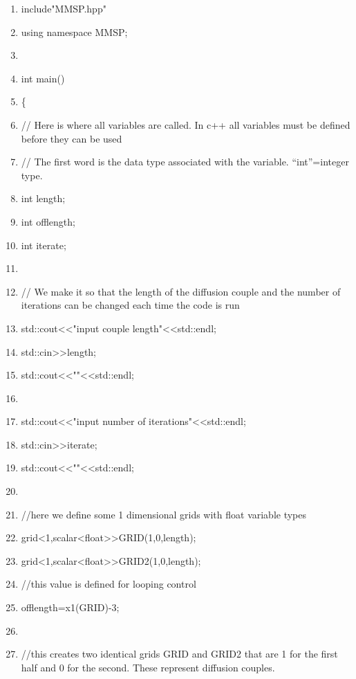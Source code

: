 \documentclass{article}
\begin{document}
\begin{shadebox}

\begin{enumerate}  \itemsep1pt \parskip0pt 
\item include"MMSP.hpp"
\item using namespace MMSP;
\item  
\item int main()
\item \{
\item // Here is where all variables are called.  In c++ all variables must be defined before they can be used
\item // The first word is the data type associated with the variable. “int”=integer type.
\item int length;
\item int offlength;
\item int iterate;
\item 
\item // We make it so that the length of the diffusion couple and the number of iterations can be changed each time the code is run
\item std::cout\textless \textless "input couple length"\textless \textless std::endl;
\item std::cin\textgreater \textgreater length;
\item std::cout\textless \textless ""\textless \textless std::endl;
\item 
\item std::cout\textless \textless "input number of iterations"\textless \textless std::endl;
\item std::cin\textgreater \textgreater iterate;
\item std::cout\textless \textless ""\textless \textless std::endl;
\item 
\item //here we define some 1 dimensional grids with float variable types
\item grid\textless 1,scalar\textless float\textgreater  \textgreater  GRID(1,0,length);
\item grid\textless 1,scalar\textless float\textgreater  \textgreater  GRID2(1,0,length);
\item //this value is defined for looping control
\item offlength=x1(GRID)-3;
\item 
\item //this creates two identical grids GRID and GRID2 that are 1 for the first half and 0 for the second.  These represent diffusion couples.

\end{enumerate}
\end{shadebox}
\end{document}
